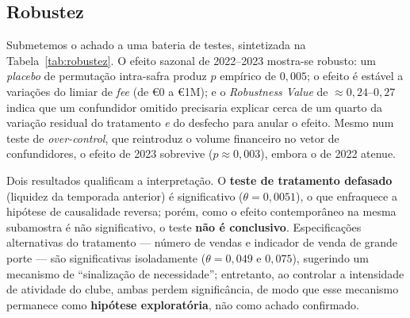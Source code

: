 \documentclass[12pt]{article}
\begin{document}
\subsection{Robustez}

Submetemos o achado a uma bateria de testes, sintetizada na Tabela~\ref{tab:robustez}. O efeito
sazonal de 2022--2023 mostra-se robusto: um \textit{placebo} de permutação intra-safra produz
$p$ empírico de $0{,}005$; o efeito é estável a variações do limiar de \textit{fee} (de €0 a €1M); e
o \textit{Robustness Value} \cite{cinelli2020} de $\approx 0{,}24$--$0{,}27$ indica que um
confundidor omitido precisaria explicar cerca de um quarto da variação residual do tratamento
\textit{e} do desfecho para anular o efeito. Mesmo num teste de \textit{over-control}, que
reintroduz o volume financeiro no vetor de confundidores, o efeito de 2023 sobrevive
($p \approx 0{,}003$), embora o de 2022 atenue.

Dois resultados qualificam a interpretação. O \textbf{teste de tratamento defasado} (liquidez da
temporada anterior) é significativo ($\theta = 0{,}0051$), o que enfraquece a hipótese de
causalidade reversa; porém, como o efeito contemporâneo na mesma subamostra é não significativo, o
teste \textbf{não é conclusivo}. Especificações alternativas do tratamento — número de vendas e
indicador de venda de grande porte — são significativas isoladamente ($\theta = 0{,}049$ e
$0{,}075$), sugerindo um mecanismo de ``sinalização de necessidade''; entretanto, ao controlar a
intensidade de atividade do clube, ambas perdem significância, de modo que esse mecanismo permanece
como \textbf{hipótese exploratória}, não como achado confirmado.
\end{document}

